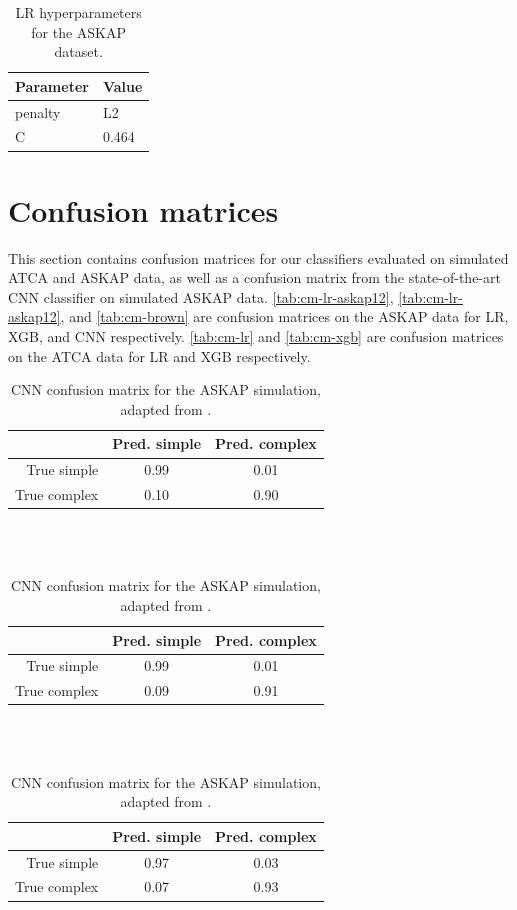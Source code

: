   \begin{table}
    \caption{\label{tab:hyperparameters-lr-askap12} LR hyperparameters for the ASKAP dataset.}
    \begin{tabular}{ll}
      \hline\hline
      Parameter & Value\\\hline
      penalty & L2\\
      C & 0.464\\
      \hline\hline
    \end{tabular}
  \end{table}

\section{Confusion matrices}
\label{sec:faraday-cms}

  This section contains confusion matrices for our classifiers evaluated on simulated ATCA and ASKAP data, as well as a confusion matrix from the state-of-the-art CNN classifier on simulated ASKAP data. \autoref{tab:cm-lr-askap12}, \autoref{tab:cm-lr-askap12}, and \autoref{tab:cm-brown} are confusion matrices on the ASKAP data for LR, XGB, and CNN respectively. \autoref{tab:cm-lr} and \autoref{tab:cm-xgb} are confusion matrices on the ATCA data for LR and XGB respectively.

    \begin{table}
      \caption{\label{tab:cm-lr-askap12} Logistic regression confusion matrix for the ASKAP simulation.}
      \begin{tabular}{r|cc}
        \hline\hline
        & Pred. simple & Pred. complex \\\hline
        True simple & 0.99 & 0.01 \\
        True complex & 0.10 & 0.90 \\
        \hline\hline
      \end{tabular}\\
      \\
      \caption{\label{tab:cm-xgb-askap12} XGB confusion matrix for the ASKAP simulation.}
      \begin{tabular}{r|cc}
        \hline\hline
        & Pred. simple & Pred. complex \\\hline
        True simple & 0.99 & 0.01 \\
        True complex & 0.09 & 0.91 \\
        \hline\hline
      \end{tabular}\\
      \\
      \caption{\label{tab:cm-brown} CNN confusion matrix for the ASKAP simulation, adapted from \citet{brown_classifying_2018}.}
      \begin{tabular}{r|cc}
        \hline\hline
        & Pred. simple & Pred. complex \\\hline
        True simple & 0.97 & 0.03 \\
        True complex & 0.07 & 0.93 \\
        \hline\hline
      \end{tabular}
    \end{table}

